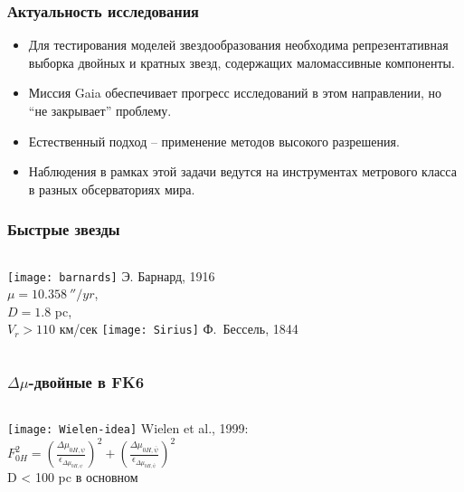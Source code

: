\begin{frame}%
\frametitle{Актуальность исследования}
{\small
\begin{itemize}
\item Для тестирования моделей звездообразования необходима репрезентативная выборка двойных и кратных звезд, содержащих маломассивные компоненты.
\item Миссия Gaia обеспечивает прогресс исследований в этом направлении, но ``не закрывает'' проблему.
\item Естественный подход -- применение методов высокого разрешения.
\item Наблюдения в рамках этой задачи ведутся на инструментах метрового класса в разных обсерваториях мира. 
\end{itemize}
}
\end{frame}



\begin{frame}
\frametitle{Быстрые звезды}
\begin{columns}
	\texttt{[image: barnards]}
	{\footnotesize Э. Барнард, 1916 \\ $\mu = 10.358~''/yr$, \\ $D = 1.8$ pc, \\ $V_r > 110$ км/сек}
	\texttt{[image: Sirius]}
    {\footnotesize Ф.~Бессель, 1844}
\end{columns}
\end{frame}


\begin{frame}%
\frametitle{$\Delta\mu$-двойные в FK6}
\begin{columns}
		\texttt{[image: Wielen-idea]}
		{\footnotesize Wielen et al., 1999:}\\
		{\footnotesize $F^{2}_{0H} =\left(\frac{\Delta\mu_{0H,\psi}}{\epsilon_{\Delta\mu_{0H,\psi}}}\right)^{2}+\left(\frac{\Delta\mu_{0H,\bar{\psi}}}{\epsilon_{\Delta\mu_{0H,\bar{\psi}}}}\right)^{2}$}\\
		{\footnotesize D < 100 pc в основном}\\
\end{columns}
\end{frame}


